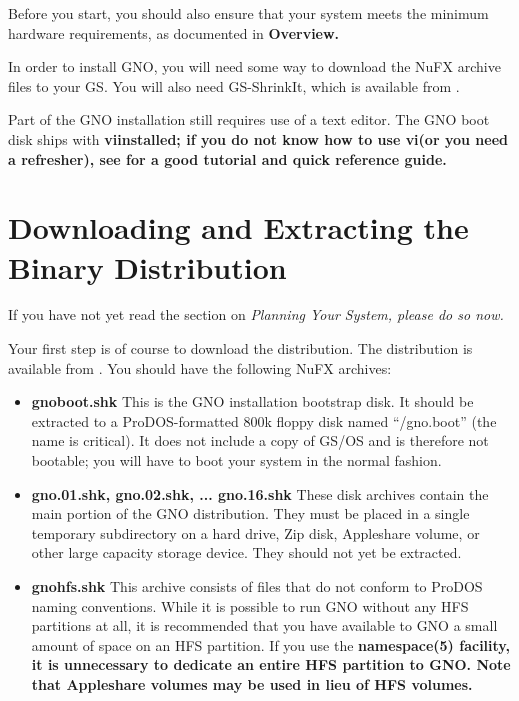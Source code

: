 \documentclass{report}
\begin{document}
Before you start, you should also ensure that your system meets the
minimum hardware requirements, as documented in \bf Overview\rm.

In order to install GNO, you will need some way to download the NuFX
archive files to your GS.  You will also need GS-ShrinkIt, which is available
from 
.

Part of the GNO installation still requires use of a text editor.  The
GNO boot disk ships with \bf vi\rm  installed;
if you do not know how to use \bf vi\rm  (or you need a refresher), see 
for a good tutorial and quick reference guide.

\section{Downloading and Extracting the Binary Distribution}

If you have not yet read the section on \it Planning Your System\rm,
please do so now.

Your first step is of course to download the distribution.
The distribution is available from 
.
You should have the following NuFX archives:

\begin{itemize}

\item{\bf gnoboot.shk\rm}
This is the GNO installation bootstrap disk.  It should be extracted to
a ProDOS-formatted 800k floppy disk named ``/gno.boot'' (the name is
critical).  It does not include a copy of GS/OS and is
therefore not bootable; you will have to boot your system in the normal
fashion.

\item{\bf gno.01.shk\rm, \bf gno.02.shk\rm, ... \bf gno.16.shk\rm}
These disk archives contain the main portion of the GNO distribution.
They must be placed in a single temporary subdirectory on a hard drive,
Zip disk, Appleshare volume, or other large capacity storage device.
They should not yet be extracted.

\item{\bf gnohfs.shk\rm}
This archive consists of files that do not conform to ProDOS naming 
conventions.  While it is possible to run GNO without any HFS partitions
at all, it is recommended that you have available to GNO a small amount
of space on an HFS partition.  If you use the \bf namespace\rm(5) facility,
it is unnecessary to dedicate an entire HFS partition to GNO.
Note that Appleshare volumes may be used in lieu of HFS volumes.

\end{itemize}
\end{document}
